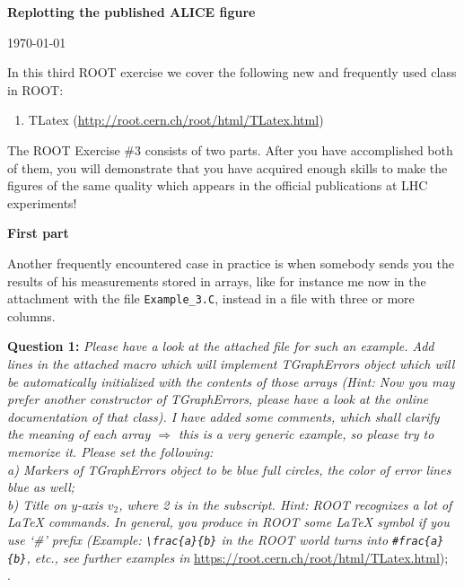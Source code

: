 \documentclass[11pt]{article}
\begin{document}
\begin{center}
\Large{\bf{Replotting the published ALICE figure}}\\
\end{center}
\begin{center}
{\small\today}
\end{center}

\bigskip

\noindent In this third ROOT exercise we cover the following new and frequently used class in ROOT:
%
\begin{enumerate}
\item TLatex (\url{http://root.cern.ch/root/html/TLatex.html})
\end{enumerate} 
%

\noindent The ROOT Exercise \#3 consists of two parts. After you have accomplished both of them, you will demonstrate that you have acquired enough skills to make the figures of the same quality which appears in the official publications at LHC experiments! 

\bigskip\bigskip\bigskip

\noindent \textbf{\Large First part}

\noindent Another frequently encountered case in practice is when somebody sends you the results of his measurements stored in arrays, like for instance me now in the attachment with the file \verb|Example_3.C|, instead in a file with three or more columns. 

\bigskip

\noindent\textbf{Question 1:} {\it Please have a look at the attached file for such an example. Add lines in the attached macro which will implement TGraphErrors object which will be automatically initialized with the contents of those arrays (Hint: Now you may prefer another constructor of TGraphErrors, please have a look at the online documentation of that class). I have added some comments, which shall clarify the meaning of each array $\Rightarrow$ this is a very generic example, so please try to memorize it. Please set the following:\\
%
\noindent a) Markers of TGraphErrors object to be blue full circles, the color of error lines blue as well;\\
%
\noindent b) Title on $y$-axis $v_2$, where 2 is in the subscript. Hint: ROOT recognizes a lot of LaTeX commands. In general, you produce in ROOT some LaTeX symbol if you use `\#' prefix (Example: \verb|\frac{a}{b}| in the ROOT world turns into \verb|#frac{a}{b}|, etc., see further examples in} \url{https://root.cern.ch/root/html/TLatex.html});\\
%
.
\end{document}
